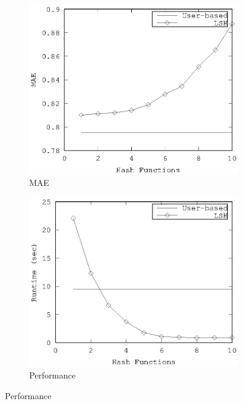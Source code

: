 \documentclass[conference]{IEEEtran}
\begin{document}
\begin{figure}[!h]
        \begin{subfigure}[b]{0.225\textwidth}
                \includegraphics[width=\textwidth]{charts/ub-mae-hash-functions.eps}
                \caption{MAE}
                \label{fig:ub-lsh-functions-mae}
        \end{subfigure}
        \quad
        \begin{subfigure}[b]{0.225\textwidth}
                \includegraphics[width=\textwidth]{charts/ub-runtime-hash-functions.eps}
                \caption{Performance}

\end{subfigure}
\end{figure}
\end{document}
